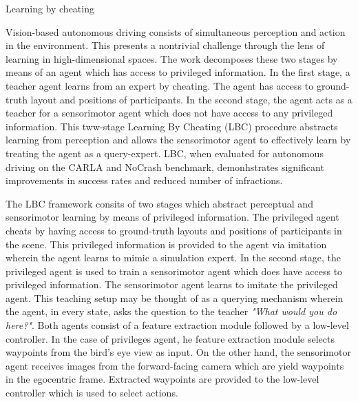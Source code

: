 \documentclass[11pt,letterpaper]{article}
\begin{document}
\begin{center}
  \large{Learning by cheating}
\end{center}

Vision-based autonomous driving consists of simultaneous perception and action in the environment. This presents a nontrivial challenge through the lens of learning in high-dimensional spaces. The work decomposes these two stages by means of an agent which has access to privileged information. In the first stage, a teacher agent learns from an expert by cheating. The agent has access to ground-truth layout and positions of participants. In the second stage, the agent acts as a teacher for a sensorimotor agent which does not have access to any privileged information. This tww-stage Learning By Cheating (LBC) procedure abstracts learning from perception and allows the sensorimotor agent to effectively learn by treating the agent as a query-expert. LBC, when evaluated for autonomous driving on the CARLA and NoCrash benchmark, demonhstrates significant improvements in success rates and reduced number of infractions.

The LBC framework consits of two stages which abstract perceptual and sensorimotor learning by means of privileged information. The privileged agent cheats by having access to ground-truth layouts and positions of participants in the scene. This privileged information is provided to the agent via imitation wherein the agent learns to mimic a simulation expert. In the second stage, the privileged agent is used to train a sensorimotor agent which does have access to privileged information. The sensorimotor agent learns to imitate the privileged agent. This teaching setup may be thought of as a querying mechanism wherein the agent, in every state, asks the question to the teacher \textit{"What would you do here?"}. Both agents consist of a feature extraction module followed by a low-level controller. In the case of privileges agent, he feature extraction module selects waypoints from the bird's eye view as input. On the other hand, the sensorimotor agent receives images from the forward-facing camera which are yield waypoints in the egocentric frame. Extracted waypoints are provided to the low-level controller which is used to select actions. 
\end{document}
